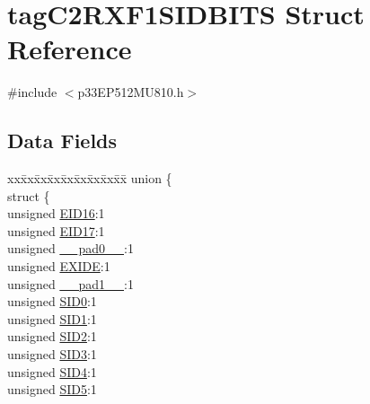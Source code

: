 \hypertarget{structtag_c2_r_x_f1_s_i_d_b_i_t_s}{}\section{tag\+C2\+R\+X\+F1\+S\+I\+D\+B\+I\+TS Struct Reference}
\label{structtag_c2_r_x_f1_s_i_d_b_i_t_s}


{\ttfamily \#include $<$p33\+E\+P512\+M\+U810.\+h$>$}

\subsection*{Data Fields}
\begin{DoxyCompactItemize}
\item 
\begin{tabbing}
xx\=xx\=xx\=xx\=xx\=xx\=xx\=xx\=xx\=\kill
union \{\\
\>struct \{\\
\>\>unsigned \hyperlink{structtag_c2_r_x_f1_s_i_d_b_i_t_s_a6dd5663b0c9838c56db040560ca0efa1}{EID16}:1\\
\>\>unsigned \hyperlink{structtag_c2_r_x_f1_s_i_d_b_i_t_s_aa648615464b0eb29967529333eee9fd9}{EID17}:1\\
\>\>unsigned \hyperlink{structtag_c2_r_x_f1_s_i_d_b_i_t_s_adf71f3d8410c1f1dbbc96680a92c49af}{\_\_pad0\_\_}:1\\
\>\>unsigned \hyperlink{structtag_c2_r_x_f1_s_i_d_b_i_t_s_a09ff1c1be3927220bd3dfbc10edfe243}{EXIDE}:1\\
\>\>unsigned \hyperlink{structtag_c2_r_x_f1_s_i_d_b_i_t_s_acaf2d0924a107ec6e8d2e31febaf66f9}{\_\_pad1\_\_}:1\\
\>\>unsigned \hyperlink{structtag_c2_r_x_f1_s_i_d_b_i_t_s_a1ca276ac15df60e1f7b9a6d0011ade93}{SID0}:1\\
\>\>unsigned \hyperlink{structtag_c2_r_x_f1_s_i_d_b_i_t_s_a3405d354f81391f879648f69f504dfc8}{SID1}:1\\
\>\>unsigned \hyperlink{structtag_c2_r_x_f1_s_i_d_b_i_t_s_ad744966dfc49307f731b7045b01b94e5}{SID2}:1\\
\>\>unsigned \hyperlink{structtag_c2_r_x_f1_s_i_d_b_i_t_s_a9345f3e64720be93e83d8dfc827f3f45}{SID3}:1\\
\>\>unsigned \hyperlink{structtag_c2_r_x_f1_s_i_d_b_i_t_s_aefb106fed4bb40e2c3c71ac612c554e3}{SID4}:1\\
\>\>unsigned \hyperlink{structtag_c2_r_x_f1_s_i_d_b_i_t_s_a0f221b3c9612231686bf87ccdcec8489}{SID5}:1\\

\end{tabbing}
\end{DoxyCompactItemize}

